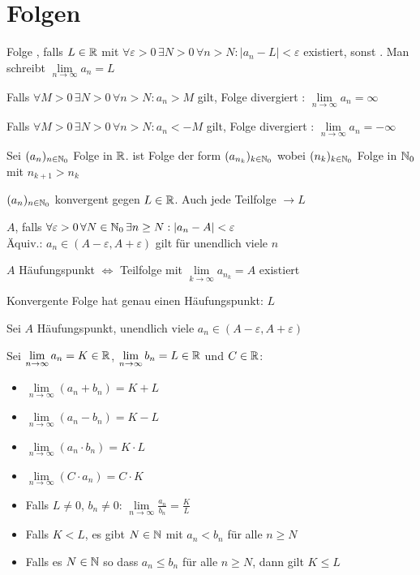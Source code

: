 \section{Folgen}

\Def Folge , falls  $L \in \mathbb{R}$ mit
$\forall \varepsilon > 0 \, \exists N > 0 \, \forall n > N : |a_n - L| < \varepsilon$
existiert, sonst .
Man schreibt $\lim\limits_{n \to \infty} a_n = L$

\Def Falls $\forall M > 0 \, \exists N > 0 \, \forall n > N : a_n > M$ gilt,
Folge divergiert : $\lim\limits_{n\to\infty}a_n = \infty$

Falls $\forall M > 0 \, \exists N > 0 \, \forall n > N : a_n < -M$ gilt,
Folge divergiert : $\lim\limits_{n\to\infty} a_n = -\infty$

\Def Sei $(a_n)_{n \in \mathbb{N}_0}$ Folge in $\mathbb{R}$.
 ist Folge der form $(a_{n_k})_{k \in \mathbb{N}_0}$
wobei $(n_k)_{k \in \mathbb{N}_0}$ Folge in $\mathbb{N}_0$ mit $n_{k+1} > n_k$

\Satz $(a_n)_{n \in \mathbb{N}_0}$ konvergent gegen $L \in \mathbb{R}$. Auch jede Teilfolge $\to L$

\Def {} $A$, falls
$\forall \varepsilon > 0 \, \forall N \in \mathbb{N}_0 \, \exists n\ge N : |a_n - A| < \varepsilon$ \\
Äquiv.: $a_n \in (A-\varepsilon, A+\varepsilon)$ gilt für unendlich viele $n$

\Satz $A$ Häufungspunkt $\iff$ Teilfolge mit $\lim\limits_{k \to \infty} a_{n_k} = A$ existiert

\Kor Konvergente Folge hat genau einen Häufungspunkt: $L$

\Kor Sei $A$ Häufungspunkt, unendlich viele $a_n \in (A-\varepsilon, A+\varepsilon)$

\Satz Sei $\lim\limits_{n\to\infty} a_n = K \in \mathbb{R}$,
$\lim\limits_{n\to\infty} b_n = L \in \mathbb{R}$ und $C \in \mathbb{R}$:
\vspace{-0.6em}
\begin{itemize}
    \item $\lim\limits_{n\to\infty}(a_n + b_n) = K + L$
    \item $\lim\limits_{n\to\infty}(a_n - b_n) = K - L$
    \item $\lim\limits_{n\to\infty}(a_n \cdot b_n) = K \cdot L$
    \item $\lim\limits_{n\to\infty}(C \cdot a_n) = C \cdot K$
    \item Falls $L\ne 0$, $b_n\ne 0$: $\lim\limits_{n\to\infty}\frac{a_n}{b_n} = \frac{K}{L}$
    \item Falls $K < L$, es gibt $N \in \mathbb{N}$ mit $a_n < b_n$ für alle $n\ge N$
    \item Falls es $N \in \mathbb{N}$ so dass $a_n\le b_n$ für alle $n\ge N$, dann gilt $K\le L$
\end{itemize}


